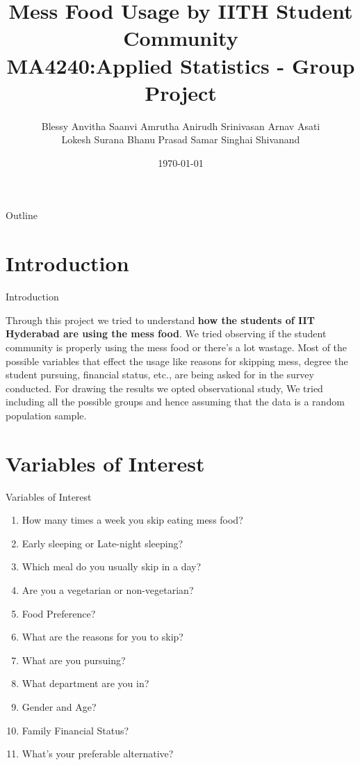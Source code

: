 \documentclass{beamer}
\title{\textbf{Mess Food Usage by IITH Student Community} \\
MA4240:Applied Statistics - Group Project}
\author{Blessy Anvitha \quad Saanvi Amrutha \quad Anirudh Srinivasan \quad Arnav Asati\\ Lokesh Surana \quad Bhanu Prasad \quad Samar Singhai \quad Shivanand}
\date{\today}
\begin{document}
\begin{frame}
    \titlepage 
\end{frame}

\logo{}
\author{}

\begin{frame}{Outline}
    \tableofcontents
\end{frame}

\section{Introduction}
\begin{frame}{Introduction}
\begin{block}{}
Through this project we tried to understand \textbf{how the students of IIT Hyderabad are using the mess food}. We tried observing if the student community is properly using the mess food or there's a lot wastage. Most of the possible variables that effect the usage like reasons for skipping mess, degree the student pursuing, financial status, etc., are being asked for in the survey conducted. For drawing the results we opted observational study, We tried including all the possible groups and hence assuming that the data is a random population sample.
\end{block}
\end{frame}

\section{Variables of Interest}
\begin{frame}{Variables of Interest}
\begin{block}{}
\begin{enumerate}
\item{How many times a week you skip eating mess food?}
\item{Early sleeping or Late-night sleeping?}
\item{Which meal do you usually skip in a day?}
\item{Are you a vegetarian or non-vegetarian?}
\item{Food Preference?}
\item{What are the reasons for you to skip?}
\item{What are you pursuing?}
\item{What department are you in?}
\item{Gender and Age?}
\item{Family Financial Status?}
\item{What's your preferable alternative?}
\end{enumerate}
\end{block}
\end{frame}
\end{document}
